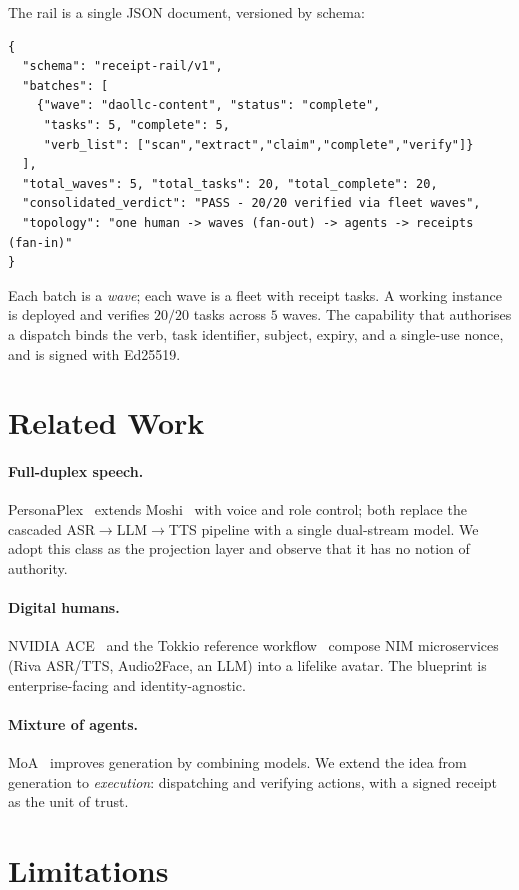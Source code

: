 \documentclass[11pt]{article}
\begin{document}
The rail is a single JSON document, versioned by schema:
\begin{verbatim}
{
  "schema": "receipt-rail/v1",
  "batches": [
    {"wave": "daollc-content", "status": "complete",
     "tasks": 5, "complete": 5,
     "verb_list": ["scan","extract","claim","complete","verify"]}
  ],
  "total_waves": 5, "total_tasks": 20, "total_complete": 20,
  "consolidated_verdict": "PASS - 20/20 verified via fleet waves",
  "topology": "one human -> waves (fan-out) -> agents -> receipts (fan-in)"
}
\end{verbatim}
Each batch is a \emph{wave}; each wave is a fleet with receipt tasks. A working
instance is deployed and verifies $20/20$ tasks across $5$ waves. The capability
that authorises a dispatch binds the verb, task identifier, subject, expiry, and a
single-use nonce, and is signed with Ed25519.

\section{Related Work}

\paragraph{Full-duplex speech.} PersonaPlex~\cite{personaplex} extends
Moshi~\cite{moshi} with voice and role control; both replace the cascaded
ASR$\rightarrow$LLM$\rightarrow$TTS pipeline with a single dual-stream model. We
adopt this class as the projection layer and observe that it has no notion of
authority.

\paragraph{Digital humans.} NVIDIA ACE~\cite{ace} and the Tokkio reference
workflow~\cite{tokkio} compose NIM microservices (Riva ASR/TTS, Audio2Face, an
LLM) into a lifelike avatar. The blueprint is enterprise-facing and
identity-agnostic.

\paragraph{Mixture of agents.} MoA~\cite{moa} improves generation by combining
models. We extend the idea from generation to \emph{execution}: dispatching and
verifying actions, with a signed receipt as the unit of trust.

\section{Limitations}
\end{document}
